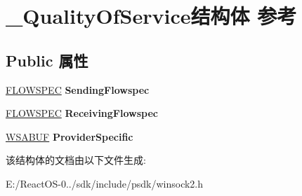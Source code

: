 \hypertarget{struct___quality_of_service}{}\section{\+\_\+\+Quality\+Of\+Service结构体 参考}
\label{struct___quality_of_service}
\subsection*{Public 属性}
\begin{DoxyCompactItemize}
\item 
\mbox{\label{struct___quality_of_service_ae7d59abad23acafdcd034314d8fd9182}} 
\hyperlink{struct__flowspec}{F\+L\+O\+W\+S\+P\+EC} {\bfseries Sending\+Flowspec}
\item 
\mbox{\label{struct___quality_of_service_af9d20ba60eff9194df70d006876d472f}} 
\hyperlink{struct__flowspec}{F\+L\+O\+W\+S\+P\+EC} {\bfseries Receiving\+Flowspec}
\item 
\mbox{\label{struct___quality_of_service_ac9a1dfe0dbdf82f5bae6b4039108cc16}} 
\hyperlink{struct___w_s_a_b_u_f}{W\+S\+A\+B\+UF} {\bfseries Provider\+Specific}
\end{DoxyCompactItemize}


该结构体的文档由以下文件生成\+:\begin{DoxyCompactItemize}
\item 
E\+:/\+React\+O\+S-\/0../sdk/include/psdk/winsock2.\+h\end{DoxyCompactItemize}
